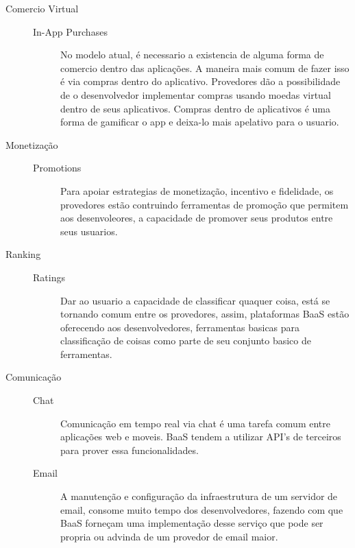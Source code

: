 \begin{description}
		\item[Comercio Virtual]
			\begin{description}
            	\item[]
				\item[In-App Purchases] { No modelo atual, é necessario a existencia de alguma forma de comercio dentro das aplicações. A maneira mais comum de fazer isso é via compras dentro do aplicativo. Provedores dão a possibilidade de o desenvolvedor implementar compras usando moedas virtual dentro de seus aplicativos. Compras dentro de aplicativos é uma forma de gamificar o app e deixa-lo mais apelativo para o usuario.}
			\end{description}
		
		\item[Monetização]
			\begin{description}
            	\item[]
				\item[Promotions] { Para apoiar estrategias de monetização, incentivo e fidelidade, os provedores estão contruindo ferramentas de promoção que permitem aos desenvoleores, a capacidade de promover seus produtos entre seus usuarios.}
			\end{description}
		
		\item[Ranking]
			\begin{description}
            	\item[]
				\item[Ratings] { Dar ao usuario a capacidade de classificar quaquer coisa, está se tornando comum entre os provedores, assim, plataformas BaaS estão oferecendo aos desenvolvedores, ferramentas basicas para classificação de coisas como parte de seu conjunto basico de ferramentas.}
			\end{description}
		
		\item[Comunicação]
			\begin{description}
				\item[]
                \item[Chat] { Comunicação em tempo real via chat é uma tarefa comum entre aplicações web e moveis. BaaS tendem a utilizar API's de terceiros para prover essa funcionalidades.}

				\item[Email] { A manutenção e configuração da infraestrutura de um servidor de email, consome muito tempo dos desenvolvedores, fazendo com que BaaS forneçam uma implementação desse serviço que pode ser propria ou advinda de um provedor de email maior.}


\end{description}
\end{description}
